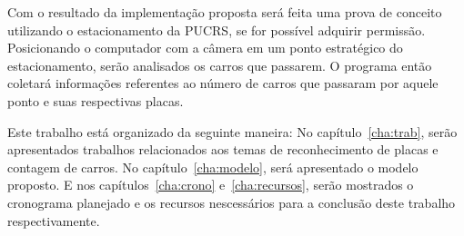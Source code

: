 Com o resultado da implementação proposta será feita uma prova de conceito
utilizando o estacionamento da PUCRS, se for possível adquirir permissão.
Posicionando o computador com a câmera em um ponto estratégico do
estacionamento, serão analisados os carros que passarem. O programa então
coletará informações referentes ao número de carros que passaram por aquele ponto
e suas respectivas placas.

Este trabalho está organizado da seguinte maneira: No capítulo~\ref{cha:trab},
serão apresentados trabalhos relacionados aos temas de reconhecimento de placas
e contagem de carros. No capítulo~\ref{cha:modelo}, será apresentado o modelo
proposto. E nos capítulos~\ref{cha:crono}  e~\ref{cha:recursos}, serão mostrados
o cronograma planejado e os recursos nescessários para a conclusão deste
trabalho respectivamente.
